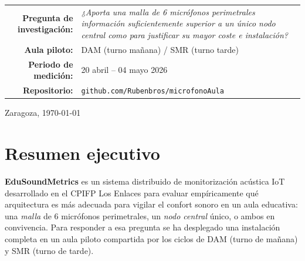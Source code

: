 \documentclass[11pt,a4paper,openany]{report}
\begin{document}
\begin{titlepage}
    \vspace{1.2cm}
    \begin{tabular}{rl}
    \textcolor{CorpAccent}{\textbf{Pregunta de investigaci\'on:}} &
        \begin{minipage}[t]{0.6\textwidth}
            \emph{¿Aporta una malla de 6 micr\'ofonos perimetrales informaci\'on suficientemente superior a un \'unico nodo central como para justificar su mayor coste e instalaci\'on?}
        \end{minipage}\\[0.4cm]
    \textcolor{CorpAccent}{\textbf{Aula piloto:}} & DAM (turno ma\~nana) / SMR (turno tarde) \\[0.2cm]
    \textcolor{CorpAccent}{\textbf{Periodo de medici\'on:}} & 20 abril -- 04 mayo 2026 \\[0.2cm]
    \textcolor{CorpAccent}{\textbf{Repositorio:}} & \texttt{github.com/Rubenbros/microfonoAula} \\
    \end{tabular}

    \vfill
    {\large Zaragoza, \today \par}
\end{titlepage}
\nopagecolor
\thispagestyle{empty}

\chapter*{Resumen ejecutivo}

\textbf{EduSoundMetrics} es un sistema distribuido de monitorizaci\'on ac\'ustica IoT desarrollado en el CPIFP Los Enlaces para evaluar empíricamente qu\'e arquitectura es m\'as adecuada para vigilar el confort sonoro en un aula educativa: una \emph{malla} de 6 micr\'ofonos perimetrales, un \emph{nodo central} \'unico, o ambos en convivencia. Para responder a esa pregunta se ha desplegado una instalaci\'on completa en un aula piloto compartida por los ciclos de DAM (turno de ma\~nana) y SMR (turno de tarde).
\end{document}
